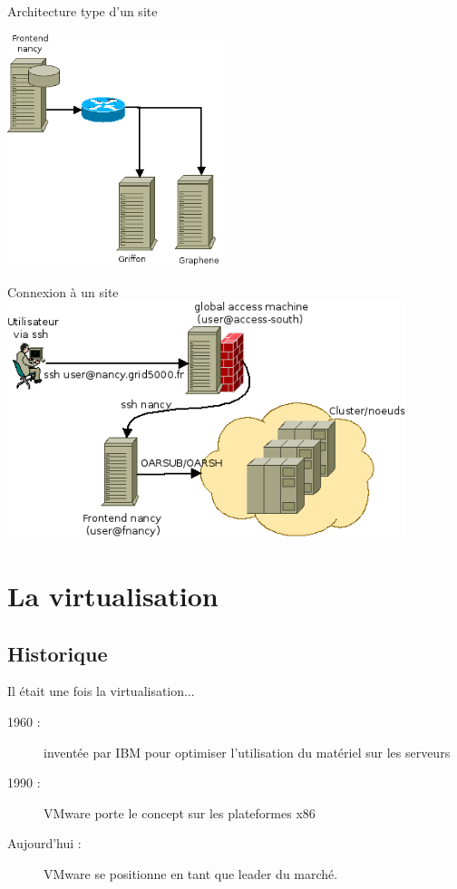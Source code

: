 \documentclass{beamer}
\begin{document}
\begin{frame}{Architecture type d'un site}
  \begin{center}
    \includegraphics[width=180pt]{images_presentation/archi.png}
  \end{center}
\end{frame}

\begin{frame}{Connexion à un site}
  \includegraphics[width=330pt]{images_presentation/plan_site.png}
\end{frame}


\section{La virtualisation}
\subsection{Historique}
\begin{frame}{Il était une fois la virtualisation...}
  \begin{description}
    \item[1960 : ] inventée par IBM pour optimiser l'utilisation du matériel sur les serveurs
\pause
    \item[1990 : ] VMware porte le concept sur les plateformes x86
\pause
    \item[Aujourd'hui : ] VMware se positionne en tant que leader du marché.
  \end{description}
\end{frame}
\end{document}
